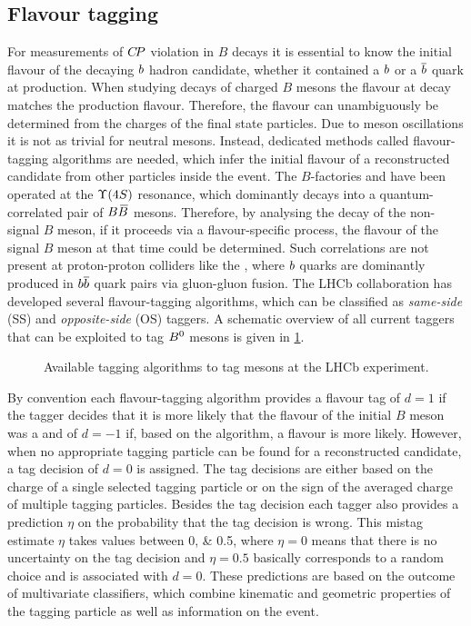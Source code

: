 
\subsection{Flavour tagging}
\label{sec:detector:software:tagging}

For measurements of ${C\!P}$ violation in $B$ decays it is essential to know the
initial flavour of the decaying ${b}$ hadron candidate, \ie whether it
contained a ${b}$ or a ${\overline {{b}}}$ quark at production. When studying
decays of charged $B$ mesons the flavour at decay matches the production
flavour. Therefore, the flavour can unambiguously be determined from the
charges of the final state particles. Due to meson oscillations it is not as
trivial for neutral mesons. Instead, dedicated methods called flavour-tagging
algorithms are needed, which infer the initial flavour of a reconstructed
candidate from other particles inside the event. The $B$-factories \babar and
\belle have been operated at the $\FourS$ resonance, which dominantly decays into a
quantum-correlated pair of $B{\kern 0.18em\overline{\kern -0.18em B}{}}$ mesons. Therefore, by analysing the decay
of the non-signal $B$ meson, \eg if it proceeds via a flavour-specific
process, the flavour of the signal $B$ meson at that time could be determined.
Such correlations are not present at proton-proton colliders like the \lhc,
where ${b}$ quarks are dominantly produced in ${{b}{\overline {{b}}}}$ quark pairs via
gluon-gluon fusion. The LHCb collaboration has developed several
flavour-tagging algorithms, which can be classified as \emph{same-side} (SS)
and \emph{opposite-side} (OS) taggers. A schematic overview of all current taggers
that can be exploited to tag ${{B}^0}$ mesons is given in
\cref{fig:detector:tagging:schematics}.
\begin{figure}[htb]
\centering

\caption{Available tagging algorithms to tag \Bz mesons at the LHCb experiment.}
\label{fig:detector:tagging:schematics}
\end{figure}
By convention each flavour-tagging algorithm provides a flavour tag of $d =
\num{+1}$ if the tagger decides that it is more likely that the flavour of the
initial $B$ meson was a \Bz and of $d = \num{-1}$ if, based on the algorithm,
a \Bzb flavour is more likely. However, when no appropriate tagging particle
can be found for a reconstructed candidate, a tag decision of $d = 0$ is
assigned. The tag decisions are either based on the charge of a single
selected tagging particle or on the sign of the averaged charge of multiple
tagging particles. Besides the tag decision each tagger also provides a
prediction $\eta$ on the probability that the tag decision is wrong. This
mistag estimate $\eta$ takes values between \numlist{0;0.5}, where $\eta =
0$ means that there is no uncertainty on the tag decision and $\eta = 0.5$
basically corresponds to a random choice and is associated with $d = 0$. These
predictions are based on the outcome of multivariate classifiers, which
combine kinematic and geometric properties of the tagging particle as well as
information on the event.

